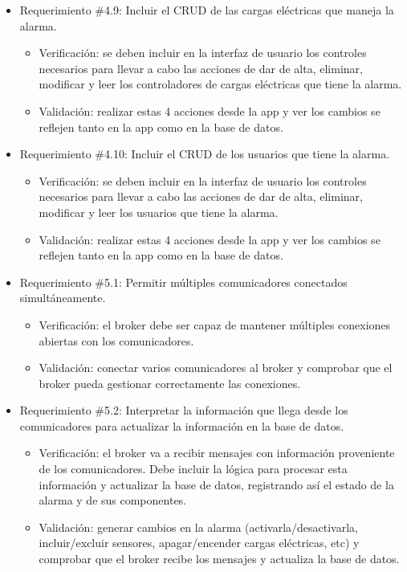 \documentclass[
11pt, %
]{charter}
\begin{document}
\begin{itemize}
	\item Requerimiento \#4.9: Incluir el CRUD de las cargas eléctricas que maneja la alarma.
	\begin{itemize}
		\item Verificación: se deben incluir en la interfaz de usuario los controles necesarios  para llevar a cabo las acciones de dar de alta, eliminar, modificar y leer los controladores de cargas eléctricas que tiene la alarma.
		\item Validación: realizar estas 4 acciones desde la app y ver los cambios se reflejen tanto en la app como en la base de datos.
	\end{itemize}
			
	\item Requerimiento \#4.10: Incluir el CRUD de los usuarios que tiene la alarma.
	\begin{itemize}
		\item Verificación: se deben incluir en la interfaz de usuario los controles necesarios  para llevar a cabo las acciones de dar de alta, eliminar, modificar y leer los usuarios que tiene la alarma.
		\item Validación: realizar estas 4 acciones desde la app y ver los cambios se reflejen tanto en la app como en la base de datos.
	\end{itemize}
			
	\item Requerimiento \#5.1: Permitir múltiples comunicadores conectados simultáneamente.
	\begin{itemize}
		\item Verificación: el broker debe ser capaz de mantener múltiples conexiones abiertas con los comunicadores.
		\item Validación: conectar varios comunicadores al broker y comprobar que el broker pueda gestionar correctamente las conexiones.
	\end{itemize}
			
	\item Requerimiento \#5.2: Interpretar la información que llega desde los comunicadores para actualizar la información en la base de datos.
	\begin{itemize}
		\item Verificación: el broker va a recibir mensajes con información proveniente de los comunicadores. Debe incluir la lógica para procesar esta información y actualizar la base de datos, registrando así el estado de la alarma y de sus componentes.
		\item Validación: generar cambios en la alarma (activarla/desactivarla, incluir/excluir sensores, apagar/encender cargas eléctricas, etc) y comprobar que el broker recibe los mensajes y actualiza la base de datos.
	\end{itemize}
		

\end{itemize}
\end{document}
